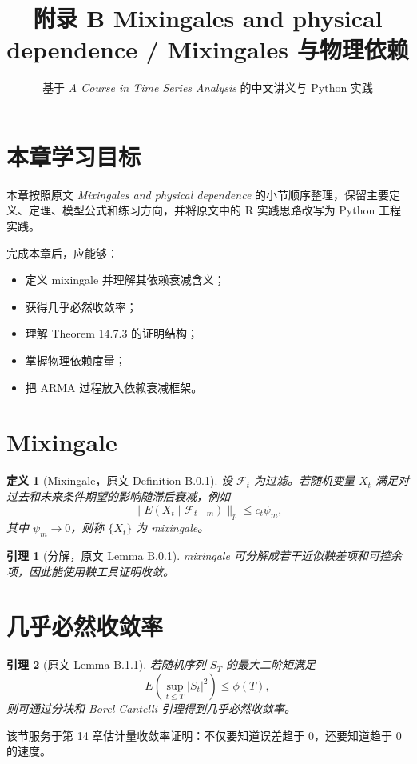 \documentclass[11pt,a4paper]{ctexart}
\title{附录 B \quad Mixingales and physical dependence / Mixingales 与物理依赖}
\author{基于 \textit{A Course in Time Series Analysis} 的中文讲义与 Python 实践}
\date{}
\newtheorem{definition}{定义}[section]
\newtheorem{lemma}{引理}[section]
\begin{document}
\maketitle

\section*{本章学习目标}

本章按照原文 \textit{Mixingales and physical dependence} 的小节顺序整理，保留主要定义、定理、模型公式和练习方向，并将原文中的 R 实践思路改写为 Python 工程实践。

完成本章后，应能够：
\begin{itemize}
  \item 定义 mixingale 并理解其依赖衰减含义；
  \item 获得几乎必然收敛率；
  \item 理解 Theorem 14.7.3 的证明结构；
  \item 掌握物理依赖度量；
  \item 把 ARMA 过程放入依赖衰减框架。
\end{itemize}

\section{Mixingale}

\begin{definition}[Mixingale，原文 Definition B.0.1]
设 \(\mathcal F_t\) 为过滤。若随机变量 \(X_t\) 满足对过去和未来条件期望的影响随滞后衰减，例如
\[
  \|E(X_t\mid\mathcal F_{t-m})\|_p\le c_t\psi_m,
\]
其中 \(\psi_m\to0\)，则称 \(\{X_t\}\) 为 mixingale。
\end{definition}

\begin{lemma}[分解，原文 Lemma B.0.1]
mixingale 可分解成若干近似鞅差项和可控余项，因此能使用鞅工具证明收敛。
\end{lemma}

\section{几乎必然收敛率}

\begin{lemma}[原文 Lemma B.1.1]
若随机序列 \(S_T\) 的最大二阶矩满足
\[
  E\left(\sup_{t\le T}|S_t|^2\right)\le \phi(T),
\]
则可通过分块和 Borel-Cantelli 引理得到几乎必然收敛率。
\end{lemma}

该节服务于第 14 章估计量收敛率证明：不仅要知道误差趋于 0，还要知道趋于 0 的速度。
\end{document}
